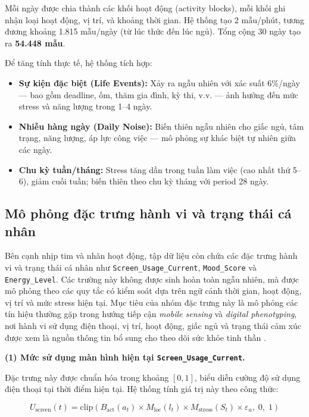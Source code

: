 Mỗi ngày được chia thành các khối hoạt động (activity blocks), mỗi khối ghi nhận loại hoạt động, vị trí, và khoảng thời gian. Hệ thống tạo 2 mẫu/phút, tương đương khoảng 1.815 mẫu/ngày (từ lúc thức đến lúc ngủ). Tổng cộng 30 ngày tạo ra \textbf{54.448 mẫu}.

Để tăng tính thực tế, hệ thống tích hợp:
\begin{itemize}
    \item \textbf{Sự kiện đặc biệt (Life Events):} Xảy ra ngẫu nhiên với xác suất 6\%/ngày — bao gồm deadline, ốm, thăm gia đình, kỳ thi, v.v. — ảnh hưởng đến mức stress và năng lượng trong 1--4 ngày.
    \item \textbf{Nhiễu hàng ngày (Daily Noise):} Biến thiên ngẫu nhiên cho giấc ngủ, tâm trạng, năng lượng, áp lực công việc — mô phỏng sự khác biệt tự nhiên giữa các ngày.
    \item \textbf{Chu kỳ tuần/tháng:} Stress tăng dần trong tuần làm việc (cao nhất thứ 5--6), giảm cuối tuần; biến thiên theo chu kỳ tháng với period 28 ngày.
\end{itemize}

\subsection{Mô phỏng đặc trưng hành vi và trạng thái cá nhân}
\label{subsec:behavioral_personal_features}

Bên cạnh nhịp tim và nhãn hoạt động, tập dữ liệu còn chứa các đặc trưng hành vi và trạng thái cá nhân như \texttt{Screen\_Usage\_Current}, \texttt{Mood\_Score} và \texttt{Energy\_Level}. Các trường này không được sinh hoàn toàn ngẫu nhiên, mà được mô phỏng theo các quy tắc có kiểm soát dựa trên ngữ cảnh thời gian, hoạt động, vị trí và mức stress hiện tại. Mục tiêu của nhóm đặc trưng này là mô phỏng các tín hiệu thường gặp trong hướng tiếp cận \textit{mobile sensing} và \textit{digital phenotyping}, nơi hành vi sử dụng điện thoại, vị trí, hoạt động, giấc ngủ và trạng thái cảm xúc được xem là nguồn thông tin bổ sung cho theo dõi sức khỏe tinh thần \cite{lane2010survey, garciaceja2018stress, likamwa2013moodscope, wang2014studentlife}.

\textbf{(1) Mức sử dụng màn hình hiện tại \texttt{Screen\_Usage\_Current}.}

Đặc trưng này được chuẩn hóa trong khoảng $[0,1]$, biểu diễn cường độ sử dụng điện thoại tại thời điểm hiện tại. Hệ thống tính giá trị này theo công thức:

\begin{equation}
\label{eq:screen_usage_current}
    U_{\text{screen}}(t) =
    \text{clip}\left(
    B_{\text{act}}(a_t)
    \times M_{\text{loc}}(l_t)
    \times M_{\text{stress}}(S_t)
    \times \varepsilon_u,\; 0,\; 1
    \right)
\end{equation}

